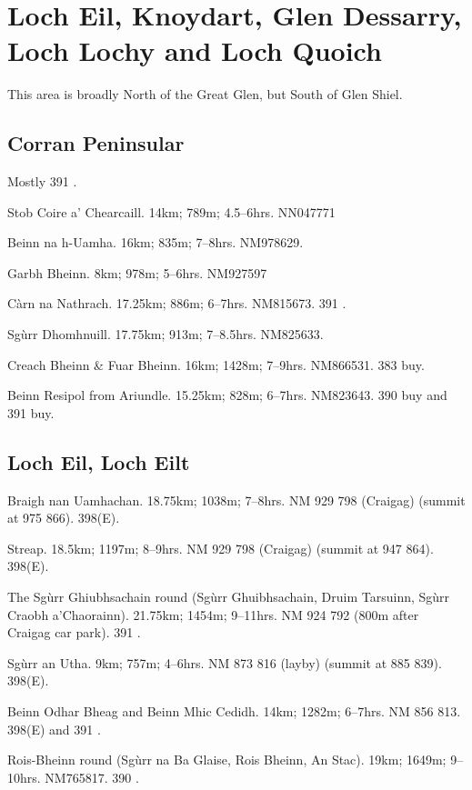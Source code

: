 \section{Loch Eil, Knoydart, Glen Dessarry, Loch Lochy and Loch Quoich}

This area is broadly North of the Great Glen, but South of Glen Shiel. 

\subsection{Corran Peninsular}

Mostly 391 \buy.

\begin{munros}
\item Stob Coire a' Chearcaill.  14km; 789m; 4.5--6hrs.  NN047771

\item
Beinn na h-Uamha.  16km; 835m; 7--8hrs.  NM978629.

\item
Garbh Bheinn.  8km; 978m; 5--6hrs.  NM927597

\item
Càrn na Nathrach.  17.25km; 886m; 6--7hrs.  NM815673.  391 \buy.

\item
Sgùrr Dhomhnuill.  17.75km; 913m; 7--8.5hrs.  NM825633.

\item
Creach Bheinn \& Fuar Bheinn.  16km; 1428m; 7--9hrs.  NM866531.  383 buy. 

\item
Beinn Resipol from Ariundle.  15.25km; 828m; 6--7hrs. NM823643.  390 buy and
391 buy.
\end{munros}


\subsection{Loch Eil, Loch Eilt}

\begin{munros}
\item\target Braigh nan Uamhachan.  18.75km; 1038m; 7--8hrs. NM 929 798
  (Craigag) (summit at 975 866).  398(E).

\item\target Streap.  18.5km; 1197m; 8--9hrs. NM 929 798
  (Craigag) (summit at 947 864).  398(E).  

\item\target The Sgùrr Ghiubhsachain round (Sgùrr Ghuibhsachain, Druim Tarsuinn,
  Sgùrr Craobh a'Chaorainn).  21.75km; 1454m; 9--11hrs.  NM 924 792 (800m after
  Craigag car park).  391 \buy.  

\item Sgùrr an Utha.  9km; 757m; 4--6hrs.  NM 873 816 (layby) (summit at 885
  839).  398(E).

\item\target
Beinn Odhar Bheag and Beinn Mhic Cedidh.  14km; 1282m; 6--7hrs.  NM 856 813.
398(E) and 391 \buy. 

\target
Rois-Bheinn round (Sgùrr na Ba Glaise, Rois Bheinn, An Stac).  19km; 1649m;
9--10hrs.  NM765817.  390 \buy.
\end{munros}

